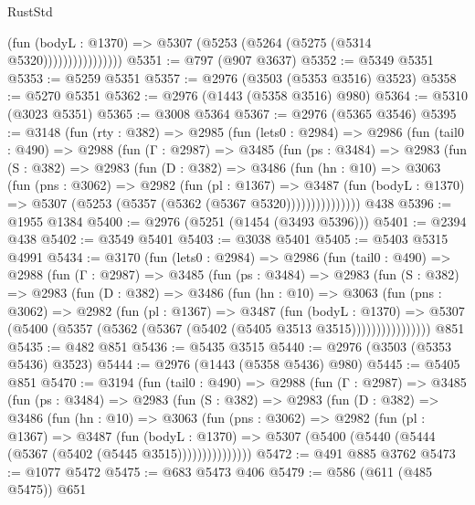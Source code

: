 \begin{lexlean}{RustStd}
\begin{coremodule}
                          (fun (bodyL : @1370) =>
                          @5307 (@5253 (@5264 (@5275 (@5314 @5320))))))))))))))))
@5351 := @797 (@907 @3637)
@5352 := @5349 @5351
@5353 := @5259 @5351
@5357 := @2976 (@3503 (@5353 @3516) @3523)
@5358 := @5270 @5351
@5362 := @2976 (@1443 (@5358 @3516) @980)
@5364 := @5310 (@3023 @5351)
@5365 := @3008 @5364
@5367 := @2976 (@5365 @3546)
@5395 := @3148
    (fun (rty : @382) =>
    @2985
      (fun (lets0 : @2984) =>
      @2986
        (fun (tail0 : @490) =>
        @2988
          (fun (Γ : @2987) =>
          @3485
            (fun (ps : @3484) =>
            @2983
              (fun (S : @382) =>
              @2983
                (fun (D : @382) =>
                @3486
                  (fun (hn : @10) =>
                  @3063
                    (fun (pns : @3062) =>
                    @2982
                      (fun (pl : @1367) =>
                      @3487
                        (fun (bodyL : @1370) =>
                        @5307 (@5253 (@5357 (@5362 (@5367 @5320)))))))))))))))
    @438
@5396 := @1955 @1384
@5400 := @2976 (@5251 (@1454 (@3493 @5396)))
@5401 := @2394 @438
@5402 := @3549 @5401
@5403 := @3038 @5401
@5405 := @5403 @5315 @4991
@5434 := @3170
    (fun (lets0 : @2984) =>
    @2986
      (fun (tail0 : @490) =>
      @2988
        (fun (Γ : @2987) =>
        @3485
          (fun (ps : @3484) =>
          @2983
            (fun (S : @382) =>
            @2983
              (fun (D : @382) =>
              @3486
                (fun (hn : @10) =>
                @3063
                  (fun (pns : @3062) =>
                  @2982
                    (fun (pl : @1367) =>
                    @3487
                      (fun (bodyL : @1370) =>
                      @5307 (@5400 (@5357 (@5362 (@5367 (@5402 (@5405 @3513 @3515))))))))))))))))
    @851
@5435 := @482 @851
@5436 := @5435 @3515
@5440 := @2976 (@3503 (@5353 @5436) @3523)
@5444 := @2976 (@1443 (@5358 @5436) @980)
@5445 := @5405 @851
@5470 := @3194
    (fun (tail0 : @490) =>
    @2988
      (fun (Γ : @2987) =>
      @3485
        (fun (ps : @3484) =>
        @2983
          (fun (S : @382) =>
          @2983
            (fun (D : @382) =>
            @3486
              (fun (hn : @10) =>
              @3063
                (fun (pns : @3062) =>
                @2982
                  (fun (pl : @1367) =>
                  @3487
                    (fun (bodyL : @1370) =>
                    @5307 (@5400 (@5440 (@5444 (@5367 (@5402 (@5445 @3515)))))))))))))))
@5472 := @491 @885 @3762
@5473 := @1077 @5472
@5475 := @683 @5473 @406
@5479 := @586 (@611 (@485 @5475)) @651

\end{coremodule}
\end{lexlean}
